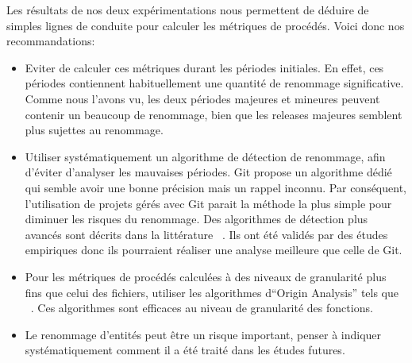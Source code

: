 Les résultats de nos deux expérimentations nous permettent de déduire de simples lignes de conduite pour calculer les métriques de procédés. Voici donc nos recommandations: 
\begin{itemize}
\item Eviter de calculer ces métriques durant les périodes initiales. En effet, ces périodes contiennent habituellement une quantité de renommage significative. Comme nous l'avons vu, les deux périodes majeures et mineures peuvent contenir un beaucoup de renommage, bien que les releases majeures semblent plus sujettes au renommage. 
\item Utiliser systématiquement un algorithme de détection de renommage, afin d'éviter d'analyser les mauvaises périodes. Git propose un algorithme dédié qui semble avoir une bonne précision mais un rappel inconnu. Par conséquent, l'utilisation de projets gérés avec Git parait la méthode la plus simple pour diminuer les risques du renommage. Des algorithmes de détection plus avancés sont décrits dans la littérature ~\cite{antoniol_automatic_2004,lavoie_inferring_2012,steidl_incremental_2014}. Ils ont été validés par des études empiriques donc ils pourraient réaliser une analyse meilleure que celle de Git. 
\item Pour les métriques de procédés calculées à des niveaux de granularité plus fins que celui des fichiers, utiliser les algorithmes d``Origin Analysis'' tels que ~\cite{wu_aura:_2010}. Ces algorithmes sont efficaces au niveau de granularité des fonctions.
\item Le renommage d'entités peut être un risque important, penser à indiquer systématiquement comment il a été traité dans les études futures.\\       
\end{itemize}
